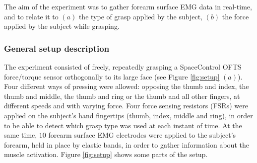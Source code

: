 The aim of the experiment was to gather forearm surface EMG data in
real-time, and to relate it to $(a)$ the type of grasp applied by the
subject, $(b)$ the force applied by the subject while grasping.

\subsubsection{General setup description}

The experiment consisted of freely, repeatedly grasping a SpaceControl
OFTS force/torque sensor \cite{ofts} orthogonally to its large face
(see Figure \ref{fig:setup} $(a)$). Four different ways of pressing
were allowed: opposing the thumb and index, the thumb and middle, the
thumb and ring or the thumb and all other fingers, at different speeds
and with varying force. Four force sensing resistors (FSRs) were
applied on the subject's hand fingertips (thumb, index, middle and
ring), in order to be able to detect which grasp type was used at each
instant of time. At the same time, $10$ forearm surface EMG electrodes
were applied to the subject's forearm, held in place by elastic bands,
in order to gather information about the muscle activation. Figure
\ref{fig:setup} shows some parts of the setup.

